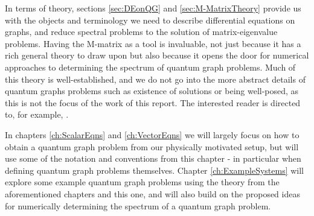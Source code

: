 In terms of theory, sections \ref{sec:DEonQG} and \ref{sec:M-MatrixTheory} provide us with the objects and terminology we need to describe differential equations on graphs, and reduce spectral problems to the solution of matrix-eigenvalue problems.
Having the M-matrix as a tool is invaluable, not just because it has a rich general theory to draw upon  but also because it opens the door for numerical approaches to determining the spectrum of quantum graph problems.
Much of this theory is well-established, and we do not go into the more abstract details of quantum graphs problems such as existence of solutions or being well-posed, as this is not the focus of the work of this report.
The interested reader is directed to, for example, . \newline

In chapters \ref{ch:ScalarEqns} and \ref{ch:VectorEqns} we will largely focus on how to obtain a quantum graph problem from our physically motivated setup, but will use some of the notation and conventions from this chapter - in particular when defining quantum graph problems themselves.
Chapter \ref{ch:ExampleSystems} will explore some example quantum graph problems using the theory from the aforementioned chapters and this one, and will also build on the proposed ideas for numerically determining the spectrum of a quantum graph problem.